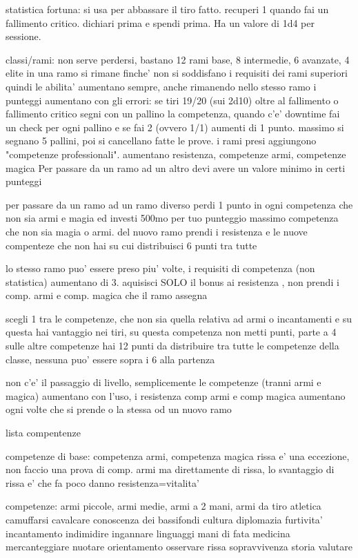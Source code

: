 \documentclass[12pt,a4paper,twoside,openany,twocolumn]{book}
\begin{document}
statistica fortuna: si usa per abbassare il tiro fatto. recuperi 1 quando fai un fallimento critico. dichiari prima e spendi prima.
Ha un valore di 1d4 per sessione.

classi/rami: non serve perdersi, bastano 12 rami base, 8 intermedie, 6 avanzate, 4 elite
in una ramo si rimane finche' non si soddisfano i requisiti dei rami superiori
quindi le abilita' aumentano sempre, anche rimanendo nello stesso ramo
i punteggi aumentano con gli errori: se tiri 19/20 (sui 2d10) oltre al fallimento o fallimento critico segni con un pallino la competenza, quando c'e' downtime fai un check per ogni pallino e se fai 2 (ovvero 1/1) aumenti di 1 punto. massimo si segnano 5 pallini, poi si cancellano fatte le prove.
i rami presi aggiungono "competenze professionali". aumentano resistenza, competenze armi, competenze magica Per passare da un ramo ad un altro devi avere un valore minimo in certi punteggi

per passare da un ramo ad un ramo diverso perdi 1 punto in ogni competenza che non sia armi e magia ed investi 500mo per tuo punteggio massimo competenza che non sia magia o armi. del nuovo ramo prendi i resistenza e le nuove compenteze che non hai su cui distribuisci 6 punti tra tutte

lo stesso ramo puo' essere preso piu' volte, i requisiti di competenza (non statistica) aumentano di 3. aquisisci SOLO il bonus ai resistenza , non prendi i comp. armi e comp. magica che il ramo assegna

scegli 1 tra le competenze, che non sia quella relativa ad armi o incantamenti e su questa hai vantaggio nei tiri, su questa competenza non metti punti, parte a 4
sulle altre competenze hai 12 punti da distribuire tra tutte le competenze della classe, nessuna puo' essere sopra i 6 alla partenza

non c'e' il passaggio di livello, semplicemente le competenze (tranni armi e magica) aumentano con l'uso, i resistenza comp armi e comp magica aumentano ogni volte che si prende o la stessa od un nuovo ramo

lista compentenze

competenze di base:  competenza armi, competenza magica
rissa e' una eccezione, non faccio una prova di comp. armi ma direttamente di rissa, lo svantaggio di rissa e' che fa poco danno
resistenza=vitalita'



competenze:
armi piccole, armi medie, armi a 2 mani, armi da tiro
atletica
camuffarsi
cavalcare
conoscenza dei bassifondi
cultura
diplomazia
furtivita'
incantamento
indimidire 
ingannare
linguaggi
mani di fata
medicina
mercanteggiare 
nuotare 
orientamento
osservare
rissa
sopravvivenza
storia
valutare
\end{document}
